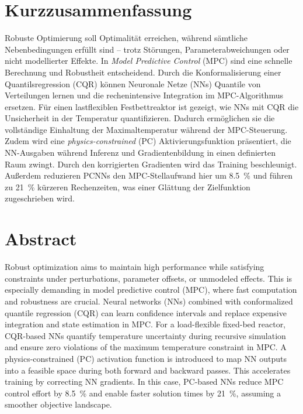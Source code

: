 \chapter*{Kurzzusammenfassung}

Robuste Optimierung soll Optimalität erreichen, während
sämtliche Nebenbedingungen erfüllt sind
–  trotz Störungen, Parameterabweichungen oder nicht modellierter Effekte.
In \emph{Model Predictive Control} (MPC) sind
eine schnelle Berechnung und Robustheit entscheidend.
Durch die Konformalisierung einer Quantilsregression (CQR) können
Neuronale Netze (NNs) Quantile von Verteilungen
lernen und die rechenintensive 
Integration im MPC-Algorithmus ersetzen.
Für einen lastflexiblen Festbettreaktor ist gezeigt, wie NNs mit CQR 
die Unsicherheit in der Temperatur quantifizieren.
Dadurch ermöglichen sie die vollständige Einhaltung der Maximaltemperatur 
während der MPC-Steuerung.
Zudem wird eine \emph{physics-constrained} (PC) Aktivierungsfunktion präsentiert, 
die NN-Ausgaben während Inferenz und Gradientenbildung
in einen definierten Raum zwingt. 
Durch den korrigierten Gradienten wird das Training beschleunigt.
Außerdem reduzieren PCNNs den 
MPC-Stellaufwand hier um \SI{8.5}{\%} und führen zu \SI{21}{\%} kürzeren Rechenzeiten,
was einer Glättung der Zielfunktion zugeschrieben wird.



\chapter*{Abstract}

Robust optimization aims to maintain high performance while satisfying constraints under perturbations,
parameter offsets, or unmodeled effects. This is especially 
demanding in model predictive control (MPC), where fast computation and robustness are crucial.
Neural networks (NNs) combined with conformalized quantile regression (CQR) can learn confidence 
intervals and replace expensive integration and state estimation in MPC.
For a load-flexible fixed-bed reactor, CQR-based NNs quantify temperature uncertainty
during recursive simulation and ensure zero violations of the maximum temperature constraint in MPC.
A physics-constrained (PC) activation function is introduced to map NN outputs into a 
feasible space during both forward and backward passes. This accelerates training by 
correcting NN gradients. In this case, PC-based NNs reduce MPC control effort by \SI{8.5}{\%}
and enable faster 
solution times by \SI{21}{\%}, assuming a smoother objective landscape.
